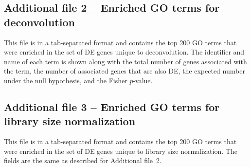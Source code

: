 \documentclass{bmcart}
\begin{document}
\begin{backmatter}
\subsection*{Additional file 2 -- Enriched GO terms for deconvolution}
This file is in a tab-separated format and contains the top 200 GO terms that were enriched in the set of DE genes unique to deconvolution.
The identifier and name of each term is shown along with the total number of genes associated with the term, the number of associated genes that are also DE, the expected number under the null hypothesis, and the Fisher $p$-value.

\subsection*{Additional file 3 -- Enriched GO terms for library size normalization}
This file is in a tab-separated format and contains the top 200 GO terms that were enriched in the set of DE genes unique to library size normalization.
The fields are the same as described for Additional file~2.

\end{backmatter}
\end{document}
